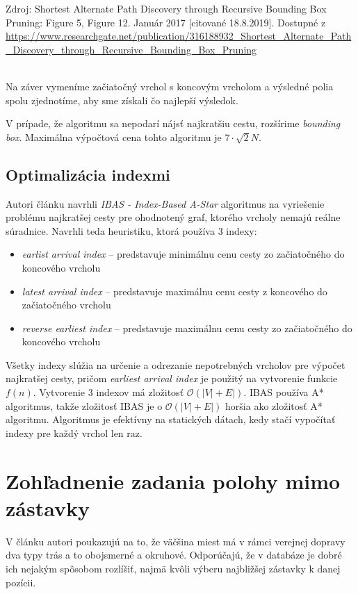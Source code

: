 \begin{footnotesize}
Zdroj: Shortest Alternate Path Discovery through Recursive Bounding Box Pruning: Figure 5, Figure 12. Január 2017 [citované 18.8.2019]. Dostupné z \url{https://www.researchgate.net/publication/316188932_Shortest_Alternate_Path_Discovery_through_Recursive_Bounding_Box_Pruning}
\end{footnotesize}\\

Na záver vymeníme začiatočný vrchol s koncovým vrcholom a výsledné polia spolu zjednotíme, aby sme získali čo najlepší výsledok. 

V prípade, že algoritmu sa nepodarí nájsť najkratšiu cestu, rozšírime \textit{bounding box}. Maximálna výpočtová cena tohto algoritmu je $7 \cdot \sqrt{2}N$.

\subsection{Optimalizácia indexmi}
Autori článku \cite{IBAS} navrhli \textit{IBAS - Index-Based A-Star} algoritmus na vyriešenie problému najkratšej cesty pre ohodnotený graf, ktorého vrcholy nemajú reálne súradnice. Navrhli teda heuristiku, ktorá používa 3 indexy: 
\begin{itemize}
\item \textit{earlist arrival index} – predstavuje minimálnu cenu cesty zo začiatočného do koncového vrcholu
\item \textit{latest arrival index} – predstavuje maximálnu cenu cesty z koncového do začiatočného vrcholu
\item \textit{reverse earliest index} – predstavuje maximálnu cenu cesty zo začiatočného do koncového vrcholu
\end{itemize} 
Všetky indexy slúžia na určenie a odrezanie nepotrebných vrcholov pre výpočet najkratšej cesty, pričom \textit{earliest arrival index} je použitý na vytvorenie funkcie $f(n)$. 
Vytvorenie 3 indexov má zložitosť $\mathcal{O}(|V| + E|)$. IBAS používa A* algoritmus, takže zložitosť IBAS je o $\mathcal{O}(|V| + E|)$ horšia ako zložitosť A* algoritmu. Algoritmus je efektívny na statických dátach, kedy stačí vypočítať indexy pre každý vrchol len raz.


\section{Zohľadnenie zadania polohy mimo zástavky}
V článku \cite{circular} autori poukazujú na to, že väčšina miest má v rámci verejnej dopravy dva typy trás a to obojsmerné a okruhové. Odporúčajú, že v databáze je dobré ich nejakým spôsobom rozlíšiť, najmä kvôli výberu najbližšej zástavky k danej pozícii.


